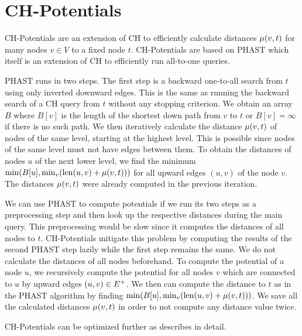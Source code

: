 \section{CH-Potentials\label{sec:ch_pot}}
CH-Potentials \cite{strasser:2021b} are an extension of CH to efficiently calculate distances $\mu(v,t)$ for many nodes $v \in V$ to a fixed node $t$. CH-Potentials are based on PHAST \cite{delling:2011} which itself is an extension of CH to efficiently run all-to-one queries.

PHAST runs in two steps. The first step is a backward one-to-all search from $t$ using only inverted downward edges. This is the same as running the backward search of a CH query from $t$ without any stopping criterion. We obtain an array $B$ where $B[v]$ is the length of the shortest down path from $v$ to $t$ or $B[v]=\infty$ if there is no such path. We then iteratively calculate the distance $\mu(v,t)$ of nodes of the same level, starting at the highest level. This is possible since nodes of the same level must not have edges between them. To obtain the distances of nodes $u$ of the next lower level, we find the minimum $\min(B[u], \min_v(\operatorname{len}(u,v) + \mu(v,t)))$ for all upward edges $(u,v)$ of the node $v$. The distances $\mu(v,t)$ were already computed in the previous iteration.

We can use PHAST to compute potentials if we run its two steps as a preprocessing step and then look up the respective distances during the main query. This preprocessing would be slow since it computes the distances of all nodes to $t$. CH-Potentials mitigate this problem by computing the results of the second PHAST step lazily while the first step remains the same. We do not calculate the distances of all nodes beforehand. To compute the potential of a node $u$, we recursively compute the potential for all nodes $v$ which are connected to $u$ by upward edges $(u,v) \in E^+$. We then can compute the distance to $t$ as in the PHAST algorithm by finding $\min(B[u], \min_v(\operatorname{len}(u,v) + \mu(v,t)))$. We save all the calculated distances $\mu(v,t)$ in order to not compute any distance value twice.

CH-Potentials can be optimized further as \cite{strasser:2021b} describes in detail.